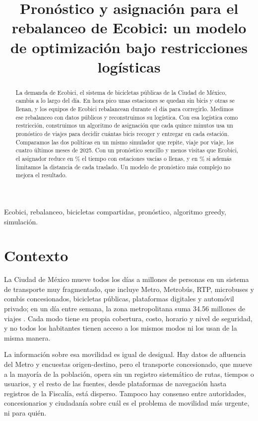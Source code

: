 \documentclass[conference,letterpaper,10pt]{IEEEtran}
\begin{document}
\raggedbottom
\title{Pronóstico y asignación para el rebalanceo de Ecobici: un modelo de optimización bajo restricciones logísticas}
\author{}
\maketitle

\begin{abstract}
La demanda de Ecobici, el sistema de bicicletas públicas de la Ciudad de México, cambia a lo largo del día. En hora pico unas estaciones se quedan sin bicis y otras se llenan, y los equipos de Ecobici rebalancean durante el día para corregirlo. Medimos ese rebalanceo con datos públicos y reconstruimos su logística. Con esa logística como restricción, construimos un algoritmo de asignación que cada quince minutos usa un pronóstico de viajes para decidir cuántas bicis recoger y entregar en cada estación. Comparamos las dos políticas en un mismo simulador que repite, viaje por viaje, los cuatro últimos meses de 2025. Con un pronóstico sencillo y menos visitas que Ecobici, el asignador reduce en \rmaPct\% el tiempo con estaciones vacías o llenas, y en \caDiezEco\% si además limitamos la distancia de cada traslado. Un modelo de pronóstico más complejo no mejora el resultado.
\end{abstract}
\begin{IEEEkeywords}
Ecobici, rebalanceo, bicicletas compartidas, pronóstico, algoritmo greedy, simulación.
\end{IEEEkeywords}

\section{Contexto}
La Ciudad de México mueve todos los días a millones de personas en un sistema de transporte muy fragmentado, que incluye Metro, Metrobús, RTP, microbuses y combis concesionados, bicicletas públicas, plataformas digitales y automóvil privado; en un día entre semana, la zona metropolitana suma 34.56 millones de viajes \cite{inegi2017}. Cada modo tiene su propia cobertura, costo, horario y nivel de seguridad, y no todos los habitantes tienen acceso a los mismos modos ni los usan de la misma manera.

La información sobre esa movilidad es igual de desigual. Hay datos de afluencia del Metro y encuestas origen-destino, pero el transporte concesionado, que mueve a la mayoría de la población, opera sin un registro sistemático de rutas, tiempos o usuarios, y el resto de las fuentes, desde plataformas de navegación hasta registros de la Fiscalía, está disperso. Tampoco hay consenso entre autoridades, concesionarios y ciudadanía sobre cuál es el problema de movilidad más urgente, ni para quién.
\end{document}

